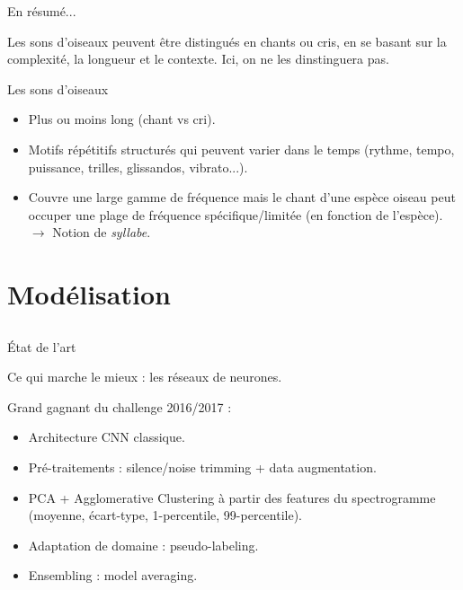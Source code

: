 \documentclass[compress,xcolor=table]{beamer}
\begin{document}
\begin{frame}{En résumé...}

    Les sons d'oiseaux peuvent être distingués en chants ou cris, en se basant sur la complexité, la longueur et le contexte. Ici, on ne les dinstinguera pas.

    \begin{block}{Les sons d'oiseaux}
        \begin{itemize}
            \item Plus ou moins long (chant vs cri).
            \item Motifs répétitifs structurés qui peuvent varier dans le temps (rythme, tempo, puissance, trilles, glissandos, vibrato...).
            \item Couvre une large gamme de fréquence mais le chant d'une espèce oiseau peut occuper une plage de fréquence spécifique/limitée (en fonction de l'espèce).\\
                  $\rightarrow$ Notion de \textit{syllabe}.
        \end{itemize}
    \end{block}

\end{frame}

\section{Modélisation} \subsection{}

\begin{frame}{État de l'art}

    Ce qui marche le mieux : les réseaux de neurones.

    Grand gagnant du challenge 2016/2017 :

    \begin{exampleblock}{ \cite{grillTwoConvolutionalNeural2017}}

        \begin{itemize}
            \item Architecture CNN classique.
            \item Pré-traitements : silence/noise trimming + data augmentation.
            \item PCA + Agglomerative Clustering à partir des features du spectrogramme (moyenne, écart-type, 1-percentile, 99-percentile).
            \item Adaptation de domaine : pseudo-labeling.
            \item Ensembling : model averaging.
        \end{itemize}

    \end{exampleblock}

\end{frame}
\end{document}
